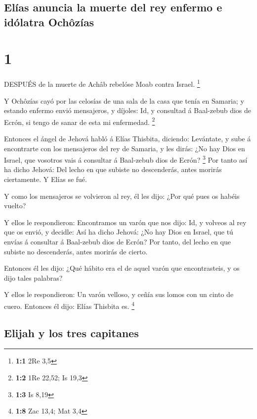 \hypertarget{eluxedas-anuncia-la-muerte-del-rey-enfermo-e-iduxf3latra-ochuxf4zuxedas}{%
\subsection{Elías anuncia la muerte del rey enfermo e idólatra
Ochôzías}\label{eluxedas-anuncia-la-muerte-del-rey-enfermo-e-iduxf3latra-ochuxf4zuxedas}}

\hypertarget{section}{%
\section{1}\label{section}}

 DESPUÉS de la muerte de Achâb rebelóse Moab contra Israel.
\footnote{\textbf{1:1} 2Re 3,5}

 Y Ochôzías cayó por las celosías de una sala de la casa que
tenía en Samaria; y estando enfermo envió mensajeros, y díjoles: Id, y
consultad á Baal-zebub dios de Ecrón, si tengo de sanar de esta mi
enfermedad. \footnote{\textbf{1:2} 1Re 22,52; Is 19,3}

 Entonces el ángel de Jehová habló á Elías Thisbita,
diciendo: Levántate, y sube á encontrarte con los mensajeros del rey de
Samaria, y les dirás: ¿No hay Dios en Israel, que vosotros vais á
consultar á Baal-zebub dios de Ecrón? \footnote{\textbf{1:3} Is 8,19}
 Por tanto así ha dicho Jehová: Del lecho en que subiste no
descenderás, antes morirás ciertamente. Y Elías se fué.

 Y como los mensajeros se volvieron al rey, él les dijo:
¿Por qué pues os habéis vuelto?

 Y ellos le respondieron: Encontramos un varón que nos dijo:
Id, y volveos al rey que os envió, y decidle: Así ha dicho Jehová: ¿No
hay Dios en Israel, que tú envías á consultar á Baal-zebub dios de
Ecrón? Por tanto, del lecho en que subiste no descenderás, antes morirás
de cierto.

 Entonces él les dijo: ¿Qué hábito era el de aquel varón que
encontrasteis, y os dijo tales palabras?

 Y ellos le respondieron: Un varón velloso, y ceñía sus
lomos con un cinto de cuero. Entonces él dijo: Elías Thisbita es.
\footnote{\textbf{1:8} Zac 13,4; Mat 3,4}

\hypertarget{elijah-y-los-tres-capitanes}{%
\subsection{Elijah y los tres
capitanes}\label{elijah-y-los-tres-capitanes}}

